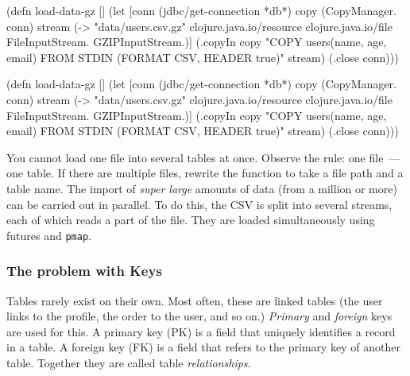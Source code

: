 
\ifnarrow

\begin{english}
  \begin{clojure/lines}
(defn load-data-gz []
  (let [conn
        (jdbc/get-connection *db*)
        copy (CopyManager. conn)
        stream
        (-> "data/users.csv.gz"
            clojure.java.io/resource
            clojure.java.io/file
            FileInputStream.
            GZIPInputStream.)]
   (.copyIn copy
     "COPY users(name, age, email)
      FROM STDIN
      (FORMAT CSV, HEADER true)"
     stream)
   (.close conn)))
  \end{clojure/lines}
\end{english}

\else

\begin{english}
  \begin{clojure/lines}
(defn load-data-gz []
  (let [conn (jdbc/get-connection *db*)
        copy (CopyManager. conn)
        stream (-> "data/users.csv.gz"
                   clojure.java.io/resource
                   clojure.java.io/file
                   FileInputStream.
                   GZIPInputStream.)]
    (.copyIn copy "COPY users(name, age, email)
                   FROM STDIN (FORMAT CSV, HEADER true)"
             stream)
    (.close conn)))
  \end{clojure/lines}
\end{english}

\fi


You cannot load one file into several tables at once. Observe the rule: one file~--- one table. If there are multiple files, rewrite the function to take a file path and a table name. The import of \emph{super large} amounts of data (from a million or more) can be carried out in parallel. To do this, the CSV is split into several streams, each of which reads a part of the file. They are loaded simultaneously using futures and \verb|pmap|.

\subsubsection*{The problem with Keys}



Tables rarely exist on their own. Most often, these are linked tables (the user links to the profile, the order to the user, and so on.) \emph{Primary} and \emph{foreign} keys are used for this. A primary key (PK) is a field that uniquely identifies a record in a table. A foreign key (FK) is a field that refers to the primary key of another table. Together they are called table \emph{relationships}.

